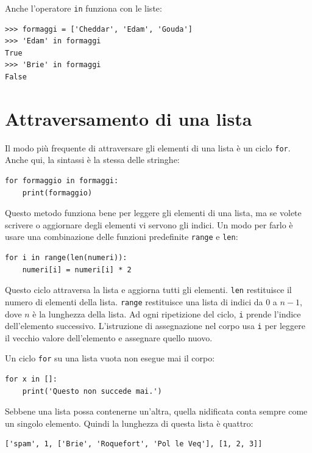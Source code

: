 \documentclass[10pt]{book}
\begin{document}
Anche l'operatore {\tt in} funziona con le liste:

\begin{verbatim}
>>> formaggi = ['Cheddar', 'Edam', 'Gouda']
>>> 'Edam' in formaggi
True
>>> 'Brie' in formaggi
False
\end{verbatim}


\section{Attraversamento di una lista}

Il modo più frequente di attraversare gli elementi di una lista è un ciclo {\tt for}. Anche qui, la sintassi è la stessa delle stringhe:

\begin{verbatim}
for formaggio in formaggi:
    print(formaggio)
\end{verbatim}
%
Questo metodo funziona bene per leggere gli elementi di una lista, ma se volete scrivere o aggiornare degli elementi vi servono gli indici. Un modo per farlo è usare una combinazione delle funzioni predefinite {\tt range} e {\tt len}:

\begin{verbatim}
for i in range(len(numeri)):
    numeri[i] = numeri[i] * 2
\end{verbatim}
%
Questo ciclo attraversa la lista e aggiorna tutti gli elementi. {\tt len}
restituisce il numero di elementi della lista.  {\tt range} restituisce una lista di indici da 0 a $n-1$, dove $n$ è la lunghezza della lista. Ad ogni ripetizione del ciclo, {\tt i} prende l'indice dell'elemento successivo. L'istruzione di assegnazione nel corpo usa {\tt i} per leggere il vecchio valore dell'elemento e assegnare quello nuovo.

Un ciclo {\tt for} su una lista vuota non esegue mai il corpo:

\begin{verbatim}
for x in []:
    print('Questo non succede mai.')
\end{verbatim}
%
Sebbene una lista possa contenerne un'altra, quella nidificata conta sempre come un singolo elemento. Quindi la lunghezza di questa lista è quattro:

\begin{verbatim}
['spam', 1, ['Brie', 'Roquefort', 'Pol le Veq'], [1, 2, 3]]
\end{verbatim}
\end{document}
